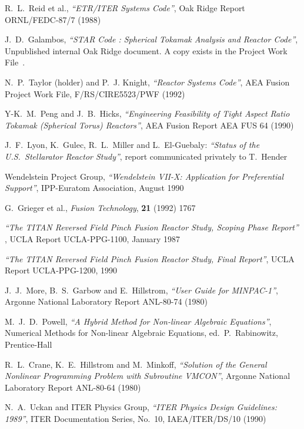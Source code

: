 \begin{thebibliography}{99}

R.\ L.\ Reid et al.,
{\it ``ETR/ITER Systems Code''},
Oak Ridge Report ORNL/FEDC-87/7
(1988)

J.\ D.\ Galambos,
{\it ``STAR Code : Spherical Tokamak Analysis and Reactor Code''},
Unpublished internal Oak Ridge document. A copy exists in the \PS
Project Work File~\cite{PWF}.

N.\ P.\ Taylor (holder) and P.\ J. Knight,
{\it ``\PS Reactor Systems Code''},
AEA Fusion Project Work File, F/RS/CIRE5523/PWF
(1992)

Y-K.\ M.\ Peng and J.\ B.\ Hicks,
{\it ``Engineering Feasibility of Tight Aspect Ratio Tokamak
(Spherical Torus) Reactors''},
AEA Fusion Report AEA FUS 64
(1990)

J.\ F.\ Lyon, K.\ Gulec, R.\ L.\ Miller and L.\ El-Guebaly:
{\it ``Status of the U.S.\ Stellarator Reactor Study''},
report communicated privately to T.\ Hender

Wendelstein Project Group,
{\it ``Wendelstein VII-X: Application for Preferential Support''},
IPP-Euratom Association, August 1990

G.\ Grieger et al., {\it Fusion Technology}, {\bf 21} (1992) 1767

{\it ``The TITAN Reversed Field Pinch Fusion Reactor Study, Scoping Phase
Report''} ,
UCLA Report UCLA-PPG-1100, January 1987

{\it ``The TITAN Reversed Field Pinch Fusion Reactor Study, Final Report''},
UCLA Report UCLA-PPG-1200, 1990

J.\ J.\ More, B.\ S.\ Garbow and E.\ Hillstrom,
{\it ``User Guide for MINPAC-1''},
Argonne National Laboratory Report ANL-80-74
(1980)

M.\ J.\ D.\ Powell,
{\it ``A Hybrid Method for Non-linear Algebraic Equations''},
Numerical Methods for Non-linear Algebraic Equations, ed.\ P.\ Rabinowitz,
Prentice-Hall

R.\ L.\ Crane, K.\ E.\ Hillstrom and M.\ Minkoff,
{\it ``Solution of the General Nonlinear Programming Problem with
Subroutine VMCON''},
Argonne National Laboratory Report ANL-80-64
(1980)

N.\ A.\ Uckan and ITER Physics Group,
{\it ``ITER Physics Design Guidelines: 1989''},
ITER Documentation Series, No.\ 10, IAEA/ITER/DS/10
(1990)


\end{thebibliography}

